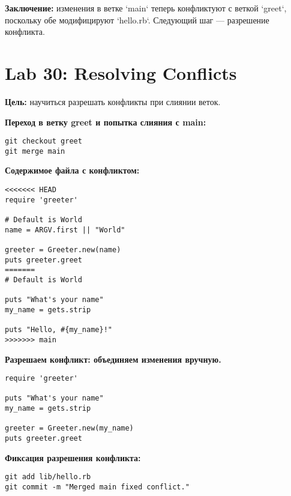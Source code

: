 \documentclass[a4paper,12pt]{report}
\begin{document}
\textbf{Заключение:} изменения в ветке `main` теперь конфликтуют с веткой `greet`, поскольку обе модифицируют `hello.rb`. Следующий шаг — разрешение конфликта.


\section{Lab 30: Resolving Conflicts}

\textbf{Цель:} научиться разрешать конфликты при слиянии веток.

\textbf{Переход в ветку greet и попытка слияния с main:}
\begin{verbatim}
git checkout greet
git merge main
\end{verbatim}


\textbf{Содержимое файла с конфликтом:}
\begin{verbatim}
<<<<<<< HEAD
require 'greeter'

# Default is World
name = ARGV.first || "World"

greeter = Greeter.new(name)
puts greeter.greet
=======
# Default is World

puts "What's your name"
my_name = gets.strip

puts "Hello, #{my_name}!"
>>>>>>> main
\end{verbatim}

\textbf{Разрешаем конфликт: объединяем изменения вручную.}

\begin{verbatim}
require 'greeter'

puts "What's your name"
my_name = gets.strip

greeter = Greeter.new(my_name)
puts greeter.greet
\end{verbatim}

\textbf{Фиксация разрешения конфликта:}
\begin{verbatim}
git add lib/hello.rb
git commit -m "Merged main fixed conflict."
\end{verbatim}

\end{document}

